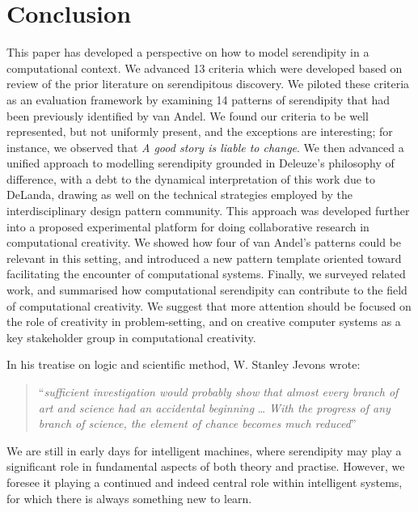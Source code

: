 \section{Conclusion}

This paper has developed a perspective on how to model serendipity in
a computational context.  We advanced 13 criteria which were developed
based on review of the prior literature on serendipitous discovery.
We piloted these criteria as an evaluation framework by examining 14
patterns of serendipity that had been previously identified by van
Andel.  We found our criteria to be well represented, but not
uniformly present, and the exceptions are interesting; for instance,
we observed that \emph{A good story is liable to change}.  We then
advanced a unified approach to modelling serendipity grounded in
Deleuze's philosophy of difference, with a debt to the dynamical
interpretation of this work due to DeLanda, drawing as well on the
technical strategies employed by the interdisciplinary design pattern
community.  This approach was developed further into a proposed
experimental platform for doing collaborative research in
computational creativity.  We showed how four of van Andel's patterns
could be relevant in this setting, and introduced a new pattern
template oriented toward facilitating the encounter of computational
systems.
%
Finally, we surveyed related work, and summarised how computational
serendipity can contribute to the field of computational creativity.
We suggest that more attention should be focused on the role of
creativity in problem-setting, and on creative computer systems as a
key stakeholder group in computational creativity.  

In his treatise on logic and scientific method, W. Stanley Jevons
wrote:
\begin{quote}
``\emph{sufficient investigation would probably show that almost every
    branch of art and science had an accidental beginning} \ldots
  \emph{With the progress of any branch of science, the element of
    chance becomes much reduced}'' \cite[p. 531]{jevons:1877}
\end{quote}
We are still in early days for intelligent machines, where serendipity
may play a significant role in fundamental aspects of both theory and
practise.  However, we foresee it playing a continued and indeed
central role within intelligent systems, for which there is always
something new to learn.
